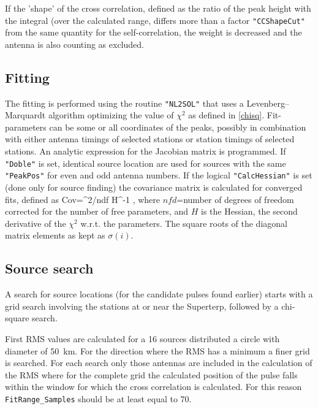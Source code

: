 If the 'shape' of the cross correlation, defined as the ratio of the peak height with the integral (over the calculated range, differs more than a factor \verb!"CCShapeCut"! from the same quantity for the self-correlation, the weight is decreased and the antenna is also counting as excluded.

\subsection{Fitting}

The fitting is performed using the routine \verb!"NL2SOL"!\cite{nl2sol} that uses a Levenberg--Marquardt algorithm optimizing the value of $\chi^2$ as defined in \eqref{chisq}. Fit-parameters can be some or all coordinates of the peaks, possibly in combination with either antenna timings of selected stations or station timings of selected stations. An analytic expression for the Jacobian matrix is programmed. If \verb!"Doble"! is set, identical source location are used for sources with the same \verb!"PeakPos"! for even and odd antenna numbers. If the logical \verb!"CalcHessian"! is set (done only for source finding) the covariance matrix is calculated for converged fits, defined as
\beq
{\rm Cov}=\chi^2/ndf \times H^{-1} \;,
\eeq
where $nfd$=number of degrees of freedom corrected for the number of free parameters, and $H$ is the Hessian, the second derivative of the $\chi^2$ w.r.t. the parameters. The square roots of the diagonal matrix elements as kept as $\sigma(i)$.

\subsection{Source search}

A search for source locations (for the candidate pulses found earlier) starts with a grid search involving the stations at or near the Superterp, followed by a chi-square search.


First RMS values are calculated for a 16 sources distributed a circle with diameter of 50~km. For the direction where the RMS has a minimum a finer grid is searched. For each search only those antennas are included in the calculation of the RMS where for the complete grid the calculated position of the pulse falls within the window for which the cross correlation is calculated. For this reason \verb!FitRange_Samples! should be at least equal to 70.

